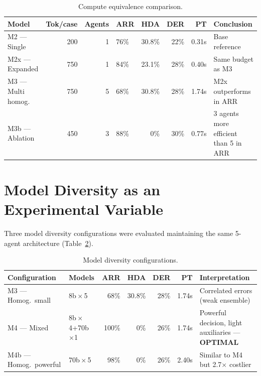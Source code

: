 \documentclass[preprint,12pt,authoryear]{elsarticle}
\begin{document}
\begin{table}[htbp]
\centering
\caption{Compute equivalence comparison.}
\label{tab:compute}
\begin{tabularx}{\textwidth}{lrrlrrrX}
\toprule
\textbf{Model} & \textbf{Tok/case} & \textbf{Agents} &
  \textbf{ARR} & \textbf{HDA} & \textbf{DER} & \textbf{PT} &
  \textbf{Conclusion} \\
\midrule
M2 --- Single       & 200 & 1 & 76\%  & 30.8\% & 22\% & 0.31s &
  Base reference \\
M2x --- Expanded    & 750 & 1 & 84\%  & 23.1\% & 28\% & 0.40s &
  Same budget as M3 \\
M3 --- Multi homog. & 750 & 5 & 68\%  & 30.8\% & 28\% & 1.74s &
  M2x outperforms in ARR \\
M3b --- Ablation    & 450 & 3 & 88\%  & 0\%    & 30\% & 0.77s &
  3 agents more efficient than 5 in ARR \\
\bottomrule
\end{tabularx}
\end{table}

\section{Model Diversity as an Experimental Variable}
\label{sec:diversity}

Three model diversity configurations were evaluated maintaining the same
5-agent architecture (Table~\ref{tab:diversity}).

\begin{table}[htbp]
\centering
\caption{Model diversity configurations.}
\label{tab:diversity}
\begin{tabularx}{\textwidth}{llrrrrl}
\toprule
\textbf{Configuration} & \textbf{Models} &
  \textbf{ARR} & \textbf{HDA} & \textbf{DER} & \textbf{PT} &
  \textbf{Interpretation} \\
\midrule
M3 --- Homog.\ small  & 8b\,$\times$\,5         & 68\%  & 30.8\% & 28\% & 1.74s &
  Correlated errors (weak ensemble) \\
M4 --- Mixed          & 8b\,$\times$4+70b\,$\times$1 & 100\% & 0\%    & 26\% & 1.74s &
  Powerful decision, light auxiliaries --- \textbf{OPTIMAL} \\
M4b --- Homog.\ powerful & 70b\,$\times$\,5     & 98\%  & 0\%    & 26\% & 2.40s &
  Similar to M4 but 2.7$\times$ costlier \\
\bottomrule
\end{tabularx}
\end{table}
\end{document}
